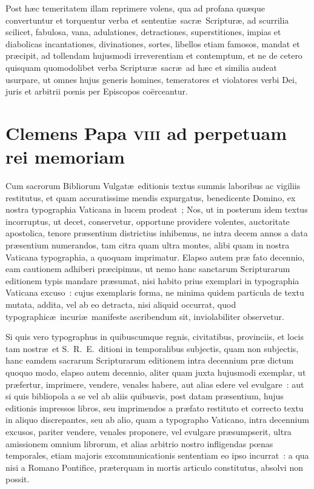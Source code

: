 Post h\ae c temeritatem illam reprimere volens, qua ad profana qu\ae que 
convertuntur et torquentur verba et sententi\ae\ sacr\ae\ Scriptur\ae, ad 
scurrilia scilicet, fabulosa, vana, adulationes, detractiones, superstitiones, 
impias et diabolicas incantationes, divinationes, sortes, libellos etiam 
famosos, mandat et pr\ae cipit, ad tollendam hujusmodi irreverentiam et 
contemptum, et ne de cetero quisquam quomodolibet verba Scriptur\ae\ 
sacr\ae\ ad h\ae c et similia audeat usurpare, ut omnes hujus generis 
homines, temeratores et violatores verbi Dei, juris et arbitrii p\oe nis per 
Episcopos co\"erceantur.


\clearpage%
{\centering \section*{Clemens Papa \textsc{viii} ad perpetuam rei memoriam}}
\addcontentsline{toc}{subsection}{Constitutio Clementis \textsc{viii}}
\noindent Cum sacrorum Bibliorum Vulgat\ae\ editionis textus summis laboribus 
ac vigiliis restitutus, et quam accuratissime mendis expurgatus, benedicente 
Domino, ex nostra typographia Vaticana in lucem prodeat~; Nos, ut in posterum 
idem textus incorruptus, ut decet, conservetur, opportune providere volentes, 
auctoritate apostolica, tenore pr\ae sentium districtius inhibemus, ne intra 
decem annos a data pr\ae sentium numerandos, tam citra quam ultra montes, alibi 
quam in nostra Vaticana typographia, a quoquam imprimatur. Elapso autem pr\ae 
fato decennio, eam cautionem adhiberi pr\ae cipimus, ut nemo hanc sanctarum 
Scripturarum editionem typis mandare pr\ae sumat, nisi habito prius exemplari 
in typographia Vaticana excuso~: cujus exemplaris forma, ne minima quidem 
particula de textu mutata, addita, vel ab eo detracta, nisi aliquid occurrat, 
quod typographic\ae\ incuri\ae\ manifeste ascribendum sit, inviolabiliter 
observetur. 

Si quis vero typographus in quibuscumque regnis, civitatibus, provinciis, et 
locis tam nostr\ae\ et S.\ R.\ E.\ ditioni in temporalibus subjectis, quam non 
subjectis, hanc eamdem sacrarum Scripturarum editionem intra decennium pr\ae 
dictum quoquo modo, elapso autem decennio, aliter quam juxta hujusmodi 
exemplar, ut pr\ae fertur, imprimere, vendere, venales habere, aut alias edere 
vel evulgare~: aut si quis bibliopola a se vel ab aliis quibusvis, post datam 
pr\ae sentium, hujus editionis impressos libros, seu imprimendos a pr\ae fato 
restituto et correcto textu in aliquo discrepantes, seu ab alio, quam a 
typographo Vaticano, intra decennium excusos, pariter vendere, venales 
proponere, vel evulgare pr\ae sumpserit, ultra amissionem omnium librorum, et 
alias arbitrio nostro infligendas p\oe nas temporales, etiam majoris 
excommunicationis sententiam eo ipso incurrat~: a qua nisi a Romano Pontifice, 
pr\ae terquam in mortis articulo constitutus, absolvi non possit. 

